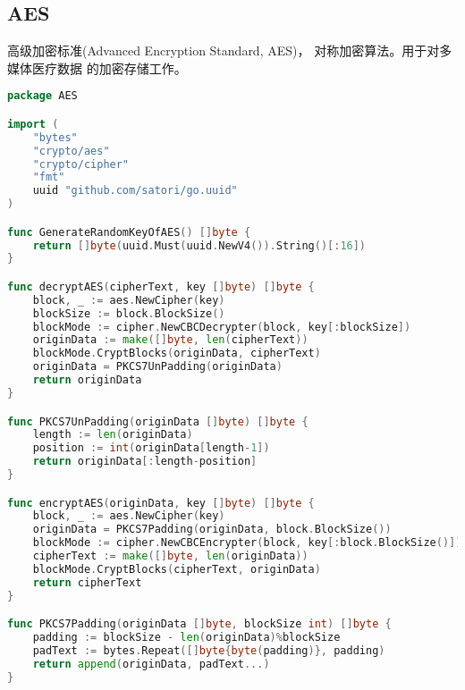 \documentclass[UTF8]{ctexart}
\begin{document}
    \subsection{AES}
    \par
    高级加密标准(Advanced Encryption Standard, AES)，
    对称加密算法。用于对多媒体医疗数据
    的加密存储工作。
    \begin{lstlisting}[language=Go]
package AES

import (
	"bytes"
	"crypto/aes"
	"crypto/cipher"
	"fmt"
	uuid "github.com/satori/go.uuid"
)

func GenerateRandomKeyOfAES() []byte {
	return []byte(uuid.Must(uuid.NewV4()).String()[:16])
}

func decryptAES(cipherText, key []byte) []byte {
	block, _ := aes.NewCipher(key)
	blockSize := block.BlockSize()
	blockMode := cipher.NewCBCDecrypter(block, key[:blockSize])
	originData := make([]byte, len(cipherText))
	blockMode.CryptBlocks(originData, cipherText)
	originData = PKCS7UnPadding(originData)
	return originData
}

func PKCS7UnPadding(originData []byte) []byte {
	length := len(originData)
	position := int(originData[length-1])
	return originData[:length-position]
}

func encryptAES(originData, key []byte) []byte {
	block, _ := aes.NewCipher(key)
	originData = PKCS7Padding(originData, block.BlockSize())
	blockMode := cipher.NewCBCEncrypter(block, key[:block.BlockSize()])
	cipherText := make([]byte, len(originData))
	blockMode.CryptBlocks(cipherText, originData)
	return cipherText
}

func PKCS7Padding(originData []byte, blockSize int) []byte {
	padding := blockSize - len(originData)%blockSize
	padText := bytes.Repeat([]byte{byte(padding)}, padding)
	return append(originData, padText...)
}
    \end{lstlisting}

\end{document}
